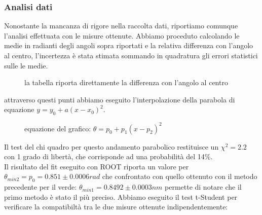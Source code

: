 \documentclass[a4paper]{article}
\theoremstyle{definition}
\begin{document}
\subsubsection{Analisi dati}
Nonostante la mancanza di rigore nella raccolta dati, riportiamo comunque l'analisi effettuata con le misure ottenute. Abbiamo proceduto calcolando le medie in radianti degli angoli sopra riportati e la relativa differenza con l'angolo al centro, l'incertezza è stata stimata sommando in quadratura gli errori statistici sulle le medie. 


\begin{figure}[!htbp]
    	\captionsetup{labelformat=empty}
    \caption{la tabella riporta direttamente la differenza con l'angolo al centro}
    \end{figure}
\noindent attraverso questi punti abbiamo eseguito l'interpolazione della parabola di equazione \(y = y_{0} +a(x-x_{0})^{2}\).\\

\begin{figure}[!ht]
    	\captionsetup{labelformat=empty}

    \caption{equazione del grafico: \(\theta = p_{0}+p_{1}(x-p_{2})^{2}\)}

\end{figure}
\noindent Il test del chi quadro per questo andamento parabolico restituisce un \(\chi^{2} = 2.2\) con 1 grado di libertà, che corrisponde ad una probabilità del 14\%. \\
\noindent Il risultato del fit eseguito con ROOT riporta un valore per\\ \(\theta_{min2} = p_{0} = 0.851 \pm 0.0006 rad\) che confrontato con quello ottenuto con il metodo precedente per il verde: \(\theta_{min1} = 0.8492 \pm 0.0003nm\) permette di notare che il primo metodo è stato il più preciso.
Abbiamo eseguito il test t-Student per verificare la compatibiltà tra le due misure ottenute indipendentemente:
\end{document}
